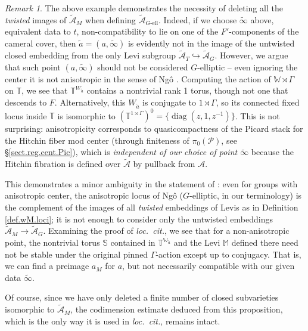 \documentclass[openany]{amsbook}
\theoremstyle{definition}
\theoremstyle{remark}
\newtheorem{remark}[theorem]{Remark}
\numberwithin{equation}{section}
\newcommand{\T}{\mathbb{T}}
\newcommand{\W}{\mathbb{W}}
\newcommand{\cA}{\mathcal{A}}
\newcommand{\cP}{\mathcal{P}}
\renewcommand{\-}{\operatorname{-}}
\newcommand{\on}[1]{\operatorname{#1}}
\newcommand{\wtilde}[1]{\widetilde{#1}}
\newcommand{\ctA}{\widetilde{\cA}}
\newcommand{\Gell}{G\text{-ell}}
\begin{document}
\begin{remark}\label{rmk.Ngo.counterex.untwisted}
    The above example demonstrates the necessity of deleting all the \emph{twisted} images of $\ctA_M$ when defining $\ctA_{\Gell}$. Indeed, if we choose $\wtilde{\infty}$ above, equivalent data to $t$, non-compatibility to lie on one of the $F'$-components of the cameral cover, then $\wtilde{a} = (a,\wtilde{\infty})$ is evidently not in the image of the untwisted closed embedding from the only Levi subgroup $\ctA_T \hookrightarrow \ctA_G$. However, we argue that such point $(a, \wtilde{\infty})$ should not be considered $G$-elliptic -- even ignoring the center it is not anisotropic in the sense of Ng\^{o} \cite[5.4.7]{ngofl}. Computing the action of $\W \rtimes \Gamma$ on $\T$, we see that $\T^{W_{\wtilde{a}}}$ contains a nontrivial rank 1 torus, though not one that descends to $F$. Alternatively, this $W_{\wtilde{a}}$ is conjugate to $1 \rtimes \Gamma$, so its connected fixed locus inside $\T$ is isomorphic to $(\T^{1 \rtimes \Gamma})^0 = \{\on{diag}(z, 1, z^{-1})\}$. This is not surprising: anisotropicity corresponds to quasicompactness of the Picard stack for the Hitchin fiber mod center (through finiteness of $\pi_0(\cP)$, see \S \ref{sect.reg.cent.Pic}), which is \emph{independent of our choice of point $\wtilde{\infty}$} because the Hitchin fibration is defined over $\ctA$ by pullback from $\cA$. 

    This demonstrates a minor ambiguity in the statement of \cite[Proposition 6.3.5]{ngofl}: even for groups with anisotropic center, the anisotropic locus of Ng\^{o} ($G$-elliptic, in our terminology) is the complement of the images of all \emph{twisted} embeddings of Levis as in Definition \ref{def.wM.loci}; it is not enough to consider only the untwisted embeddings $\ctA_M \to \ctA_G$. Examining the proof of \textit{loc.\ cit.}, we see that for a non-anisotropic point, the nontrivial torus $\mathbb{S}$ contained in $\T^{\W_{\wtilde{a}}}$ and the Levi $\mathbb{M}$ defined there need not be stable under the original pinned $\Gamma$-action except up to conjugacy. That is, we can find a preimage $a_M$ for $a$, but not necessarily compatible with our given data $\wtilde{\infty}$. 

    Of course, since we have only deleted a finite number of closed subvarieties isomorphic to $\ctA_M$, the codimension estimate deduced from this proposition, which is the only way it is used in \textit{loc.\ cit.}, remains intact.
\end{remark}
\end{document}
